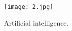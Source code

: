 \documentclass[10pt,twocolumn,letterpaper]{article}
\begin{document}
\begin{figure}[!htb]
\begin{center}
   \texttt{[image: 2.jpg]}
\end{center}
   \caption{Artificial intelligence.}
\label{fig:twocol}
\end{figure}

{\small


}
\end{document}
